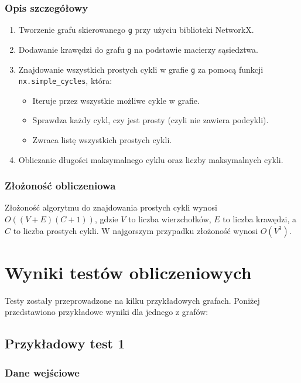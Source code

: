 \documentclass[a4paper, 12pt]{article}
\begin{document}
\subsubsection*{Opis szczegółowy}

\begin{enumerate}
    \item Tworzenie grafu skierowanego \texttt{g} przy użyciu biblioteki NetworkX.
    \item Dodawanie krawędzi do grafu \texttt{g} na podstawie macierzy sąsiedztwa.
    \item Znajdowanie wszystkich prostych cykli w grafie \texttt{g} za pomocą funkcji \texttt{nx.simple\_cycles}, która:
    \begin{itemize}
        \item Iteruje przez wszystkie możliwe cykle w grafie.
        \item Sprawdza każdy cykl, czy jest prosty (czyli nie zawiera podcykli).
        \item Zwraca listę wszystkich prostych cykli.
    \end{itemize}
    \item Obliczanie długości maksymalnego cyklu oraz liczby maksymalnych cykli.
\end{enumerate}

\subsubsection*{Złożoność obliczeniowa}

Złożoność algorytmu do znajdowania prostych cykli wynosi \\$O((V+E)(C+1))$, gdzie $V$ to liczba wierzchołków, $E$ to liczba krawędzi, a $C$ to liczba prostych cykli. W najgorszym przypadku złożoność wynosi $O(V^3)$.

\section{Wyniki testów obliczeniowych}

Testy zostały przeprowadzone na kilku przykładowych grafach. Poniżej przedstawiono przykładowe wyniki dla jednego z grafów:

\subsection{Przykładowy test 1}

\subsubsection*{Dane wejściowe}
\end{document}
